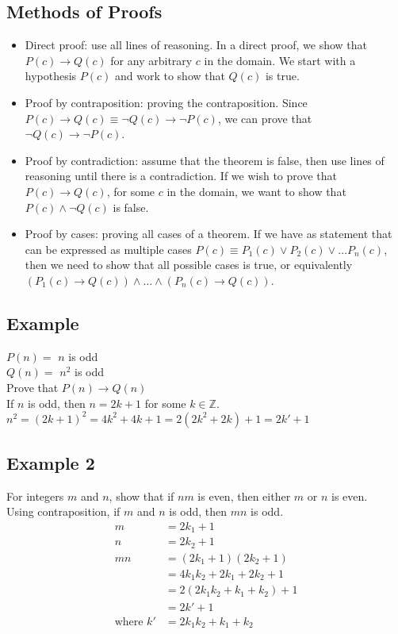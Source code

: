 \documentclass{article}
\theoremstyle{mytheoremstyle}
\theoremstyle{mytheoremstyle}
\theoremstyle{myproblemstyle}
\begin{document}
    \subsection*{Methods of Proofs}
    \begin{itemize}
        \item Direct proof: use all lines of reasoning. In a direct proof, we
            show that $P(c) \rightarrow Q(c)$ for any arbitrary $c$ in the
            domain. We start with a hypothesis $P(c)$ and work to show that
            $Q(c)$ is true.
        \item Proof by contraposition: proving the contraposition. Since $P(c)
            \rightarrow Q(c) \equiv \neg Q(c) \rightarrow \neg P(c)$, we can
            prove that $\neg Q(c) \rightarrow \neg P(c)$.
        \item Proof by contradiction: assume that the theorem is false, then use
            lines of reasoning until there is a contradiction. If we wish to
            prove that $P(c) \rightarrow Q(c)$, for some $c$ in the domain, we
            want to show that $P(c) \wedge \neg Q(c)$ is false.
        \item Proof by cases: proving all cases of a theorem. If we have as
            statement that can be expressed as multiple cases $P(c)\equiv P_1(c)
            \vee P_2(c) \vee \dots P_n(c)$, then we need to show that all
            possible cases is true, or equivalently $(P_1(c) \rightarrow Q(c))
            \wedge \dots \wedge (P_n(c) \rightarrow Q(c))$.
    \end{itemize}

    \subsection*{Example}
    $P(n) = $ $n$ is odd\\
    $Q(n) = $ $n^2$ is odd\\
    Prove that $P(n) \rightarrow Q(n)$ \\
    If $n$ is odd, then $n=2k+1$ for some $k\in \mathbb{Z}$. \\
    $n^2 = (2k+1)^2 = 4k^2+4k+1 = 2(2k^2+2k) + 1 = 2k'+1$

    \subsection*{Example 2}
    For integers $m$ and $n$, show that if $nm$ is even, then either $m$ or $n$
    is even. \\
    Using contraposition, if $m$ and $n$ is odd, then $mn$ is odd.
    \begin{align*}
        m &= 2k_1 + 1 \\
        n &= 2k_2 + 1 \\
        mn &= (2k_1 + 1) (2k_2 + 1) \\
        &= 4k_1k_2 + 2k_1 + 2k_2 + 1 \\
        &= 2(2k_1k_2 + k_1 + k_2) + 1 \\
        &= 2k' + 1 \\
        \text{where } k' &= 2k_1k_2 + k_1 + k_2
    \end{align*}
\end{document}
